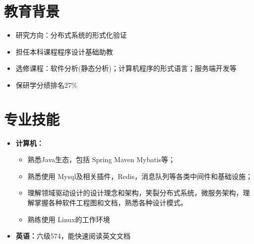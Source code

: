 \documentclass{resume}
\begin{document}

\sepspace
{}

\section{教育背景}
\begin{itemize}
    \item 研究方向：分布式系统的形式化验证
    \item 担任本科课程程序设计基础助教
\end{itemize}
\begin{itemize}
    \item 选修课程：软件分析(静态分析)；计算机程序的形式语言；服务端开发等
    \item 保研学分绩排名27\%
\end{itemize}
\sepspace

\section{专业技能}
\begin{itemize}
    \item \textbf{计算机：}
    \begin{itemize}
        \item 熟悉Java生态，包括 Spring Maven Mybatis等；
        \item 熟悉使用 Mysql及相关插件，Redis，消息队列等各类中间件和基础设施；
        \item 理解领域驱动设计的设计理念和架构，笑裂分布式系统，微服务架构，理解掌握各种软件工程图和文档，熟悉各种设计模式。
        \item 熟练使用 Linux的工作环境
    \end{itemize}
    \item \textbf{英语：}{六级574，能快速阅读英文文档}
\end{itemize}
\sepspace
\end{document}
